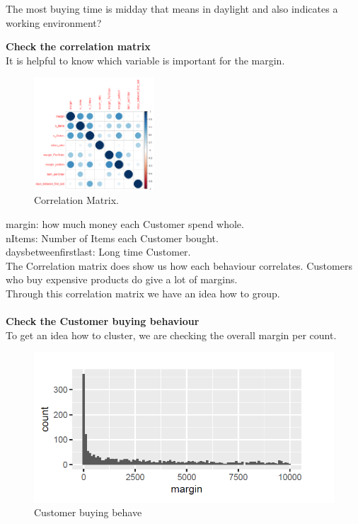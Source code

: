 \documentclass[11pt]{article}
\begin{document}
The most buying time is midday that means in daylight and also indicates a working environment?  


\textbf{Check the correlation matrix}\\
It is helpful to know which variable is important for the margin.

\begin{figure}[!htp]        
  \centering
    \includegraphics[width=0.4\textwidth]{pics/Korrelation.jpg}
    \caption{Correlation Matrix.}
\end{figure}
margin: how much money each Customer spend whole. \\
nItems: Number of Items each Customer bought. \\
daysbetweenfirstlast: Long time Customer.\\


The Correlation matrix does show us how each behaviour correlates. Customers who buy expensive products do give a lot of margins.\\
Through this correlation matrix we have an idea how to group.\\
\\
\textbf{Check the Customer buying behaviour}\\
To get an idea how to cluster, we are checking the overall margin per count. 


\begin{figure}[!htp]        
  \centering
    \includegraphics[width=.8\textwidth]{pics/cout_maring.jpg}
    \caption{Customer buying behave}
\end{figure}
\end{document}
